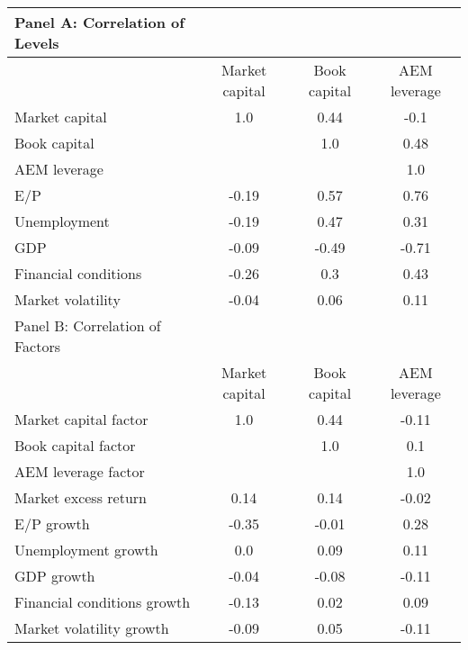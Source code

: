 
    \begin{table}[htbp]
    \centering
    \begin{adjustbox}{max width=\textwidth}
    \small
    \begin{tabular}{lccc}
        \toprule
        Panel A: Correlation of Levels \\
        \midrule
         & Market capital & Book capital & AEM leverage \\
        \midrule
        Market capital & 1.0 & 0.44 & -0.1 \\
Book capital &  & 1.0 & 0.48 \\
AEM leverage &  &  & 1.0 \\
E/P & -0.19 & 0.57 & 0.76 \\
Unemployment & -0.19 & 0.47 & 0.31 \\
GDP & -0.09 & -0.49 & -0.71 \\
Financial conditions & -0.26 & 0.3 & 0.43 \\
Market volatility & -0.04 & 0.06 & 0.11 \\
        \midrule
        Panel B: Correlation of Factors \\
        \midrule
         & Market capital & Book capital & AEM leverage \\
        \midrule
        Market capital factor & 1.0 & 0.44 & -0.11 \\
Book capital factor &  & 1.0 & 0.1 \\
AEM leverage factor &  &  & 1.0 \\
Market excess return & 0.14 & 0.14 & -0.02 \\
E/P growth & -0.35 & -0.01 & 0.28 \\
Unemployment growth & 0.0 & 0.09 & 0.11 \\
GDP growth & -0.04 & -0.08 & -0.11 \\
Financial conditions growth & -0.13 & 0.02 & 0.09 \\
Market volatility growth & -0.09 & 0.05 & -0.11 \\
        \bottomrule
    \end{tabular}
    \end{adjustbox}
    \end{table}
    